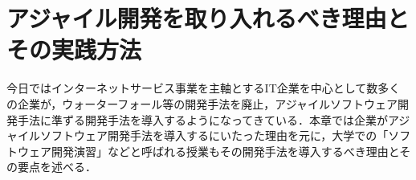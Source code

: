 \chapter{アジャイル開発を取り入れるべき理由とその実践方法}

今日ではインターネットサービス事業を主軸とするIT企業を中心として数多くの企業が，ウォーターフォール等の開発手法を廃止，アジャイルソフトウェア開発手法に準ずる開発手法を導入するようになってきている．本章では企業がアジャイルソフトウェア開発手法を導入するにいたった理由を元に，大学での「ソフトウェア開発演習」などと呼ばれる授業もその開発手法を導入するべき理由とその要点を述べる．



